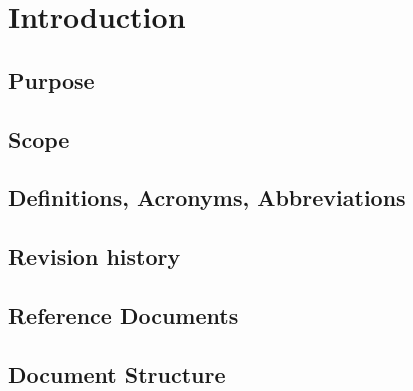 \documentclass[DD.tex]{subfiles}
\begin{document}
\section{Introduction}
\subsection{Purpose}
\subsection{Scope}
\subsection{Definitions, Acronyms, Abbreviations}
\subsection{Revision history}
\subsection{Reference Documents}
\subsection{Document Structure}
\end{document}
